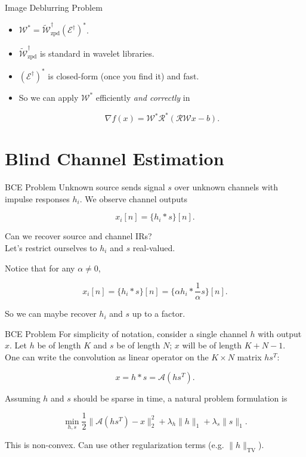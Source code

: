 \documentclass[xcolor=dvipsnames,t]{beamer} %
\begin{document}
\begin{frame}{Image Deblurring Problem}
   \begin{itemize}
      \item $\mathcal{W}^\ast = \tilde{\mathcal{W}}_\text{zpd}^\dagger(\mathcal{E}^\dagger)^\ast$.
      \item $\tilde{\mathcal{W}}_\text{zpd}^\dagger$ is standard in wavelet libraries.
      \item $(\mathcal{E}^\dagger)^\ast$ is closed-form (once you find it) and fast.
      \item So we can apply $\mathcal{W}^\ast$ efficiently \emph{and correctly} in

         \[ \nabla f(x) = \mathcal{W}^\ast\mathcal{R}^\ast\left(\mathcal{RW}x-b\right). \] 
   \end{itemize}
\end{frame}



\section{Blind Channel Estimation}
\begin{frame}{BCE Problem}
   Unknown source sends signal $s$ over unknown channels with impulse responses $h_i$.  We observe channel outputs

   \[ x_i[n] = \{h_i\ast s\}[n]. \] 
   
   \noindent Can we recover source and channel IRs?\\

   Let's restrict ourselves to $h_i$ and $s$ real-valued.

   Notice that for any $\alpha\neq 0$, 

   \[ x_i[n] = \{h_i\ast s\}[n] = \{\alpha h_i \ast \dfrac{1}{\alpha} s\}[n]. \] 

   \noindent So we can maybe recover $h_i$ and $s$ up to a factor.

\end{frame}

\begin{frame}{BCE Problem}
   For simplicity of notation, consider a single channel $h$ with output $x$.  Let $h$ be of length $K$ and $s$ be of length $N$; $x$ will be of length $K+N-1$.\\[0.5em]

   One can write the convolution as linear operator on the $K\times N$ matrix $hs^T$:

   \[ x = h\ast s = \mathcal{A}(hs^T). \] 

   \noindent Assuming $h$ and $s$ should be sparse in time, a natural problem formulation is
      
   \[ \min_{h,s} \dfrac{1}{2}\|\mathcal{A}(hs^T)-x\|_2^2 + \lambda_h\|h\|_1 + \lambda_s\|s\|_1. \] 

   \noindent This is non-convex.  Can use other regularization terms (e.g. $\|h\|_\text{TV}$).
\end{frame}
\end{document}
